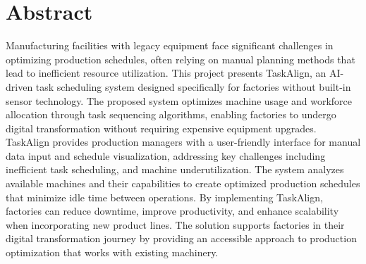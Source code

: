 \chapter*{Abstract}
\label{chap:abstract}

Manufacturing facilities with legacy equipment face significant challenges in optimizing production schedules, often relying on manual planning methods that lead to inefficient resource utilization. This project presents TaskAlign, an AI-driven task scheduling system designed specifically for factories without built-in sensor technology. The proposed system optimizes machine usage and workforce allocation through task sequencing algorithms, enabling factories to undergo digital transformation without requiring expensive equipment upgrades. TaskAlign provides production managers with a user-friendly interface for manual data input and schedule visualization, addressing key challenges including inefficient task scheduling, and machine underutilization. The system analyzes available machines and their capabilities to create optimized production schedules that minimize idle time between operations. By implementing TaskAlign, factories can reduce downtime, improve productivity, and enhance scalability when incorporating new product lines. The solution supports factories in their digital transformation journey by providing an accessible approach to production optimization that works with existing machinery.